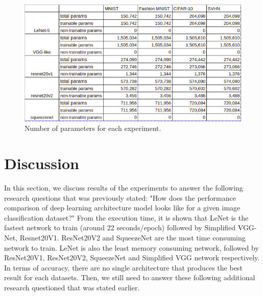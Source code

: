\begin{figure}[h]
	\includegraphics[scale=0.5]{figures/params}
	\centering
	\caption{Number of parameters for each experiment.}
	\label{fig:params}
\end{figure}

\section{Discussion}
In this section, we discuss results of the experiments to answer the following research questions that was previously stated: "How does the performance comparison of deep learning architecture model looks like for a given image classification dataset?"
From the execution time, it is shown that LeNet is the fastest network to train (around 22 seconds/epoch) followed by Simplified VGG-Net, Resnet20V1. ResNet20V2 and SqueezeNet are the most time consuming network to train. LeNet is also the least memory consuming network, followed by ResNet20V1, ResNet20V2, SqueezeNet and Simplified VGG network respectively. In terms of accuracy, there are no single architecture that produces the best result for each datasets. Then, we still need to answer these following additional research questioned that was stated earlier. 

